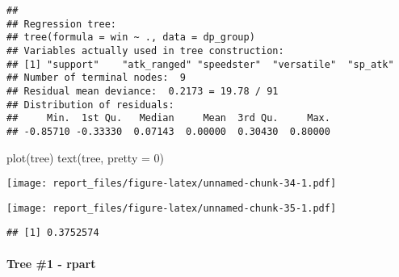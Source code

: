 \documentclass[
]{article}
\newenvironment{Shaded}{\begin{snugshade}}{\end{snugshade}}
\newcommand{\AttributeTok}[1]{\textcolor[rgb]{0.77,0.63,0.00}{#1}}
\newcommand{\DecValTok}[1]{\textcolor[rgb]{0.00,0.00,0.81}{#1}}
\newcommand{\FunctionTok}[1]{\textcolor[rgb]{0.00,0.00,0.00}{#1}}
\newcommand{\NormalTok}[1]{#1}
\newcommand{\OtherTok}[1]{\textcolor[rgb]{0.56,0.35,0.01}{#1}}
\newcommand{\SpecialCharTok}[1]{\textcolor[rgb]{0.00,0.00,0.00}{#1}}
\begin{document}
\begin{verbatim}
## 
## Regression tree:
## tree(formula = win ~ ., data = dp_group)
## Variables actually used in tree construction:
## [1] "support"    "atk_ranged" "speedster"  "versatile"  "sp_atk"    
## Number of terminal nodes:  9 
## Residual mean deviance:  0.2173 = 19.78 / 91 
## Distribution of residuals:
##     Min.  1st Qu.   Median     Mean  3rd Qu.     Max. 
## -0.85710 -0.33330  0.07143  0.00000  0.30430  0.80000
\end{verbatim}

\begin{Shaded}
\begin{Highlighting}[]
\FunctionTok{plot}\NormalTok{(tree)}
\FunctionTok{text}\NormalTok{(tree, }\AttributeTok{pretty =} \DecValTok{0}\NormalTok{)}
\end{Highlighting}
\end{Shaded}

\texttt{[image: report\_files/figure-latex/unnamed-chunk-34-1.pdf]}

\begin{Shaded}
\end{Shaded}

\texttt{[image: report\_files/figure-latex/unnamed-chunk-35-1.pdf]}

\begin{Shaded}
\end{Shaded}

\begin{verbatim}
## [1] 0.3752574
\end{verbatim}

\hypertarget{tree-1---rpart}{%
\paragraph{Tree \#1 - rpart}\label{tree-1---rpart}}
\end{document}
